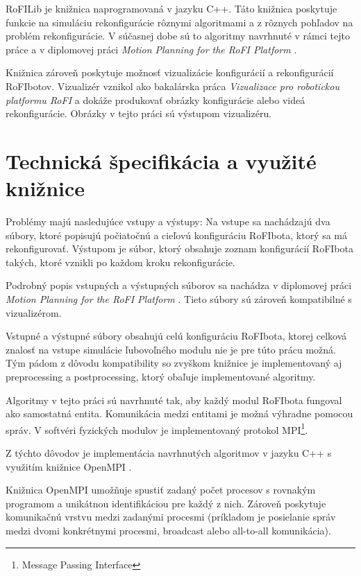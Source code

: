 \documentclass[
  digital, %
  oneside, %
  table,   %
  lof,     %
  nolot,     %
]{fithesis3}
\begin{document}
RoFILib je knižnica naprogramovaná v jazyku C++. Táto knižnica poskytuje funkcie na simuláciu rekonfigurácie rôznymi algoritmami a z rôznych pohľadov na problém rekonfigurácie. V súčasnej dobe sú to algoritmy navrhnuté v rámci tejto práce a v diplomovej práci \textit{Motion Planning for the RoFI Platform} \cite{vozarovaMasterThesis}.

Knižnica zároveň poskytuje možnosť vizualizácie konfigurácií a rekonfigurácií RoFIbotov. Vizualizér vznikol ako bakalárska práca \textit{Vizualizace pro robotickou platformu RoFI} \cite{nausovaBachelorThesis} a dokáže produkovať obrázky konfigurácie alebo videá rekonfigurácie. Obrázky v tejto práci sú výstupom vizualizéru. 

\section{Technická špecifikácia a využité knižnice}
\label{sec:libraries}
Problémy majú nasledujúce vstupy a výstupy: Na vstupe sa nachádzajú dva súbory, ktoré popisujú počiatočnú a cieľovú konfiguráciu RoFIbota, ktorý sa má rekonfigurovať. Výstupom je súbor, ktorý obsahuje zoznam konfigurácií RoFIbota takých, ktoré vznikli po každom kroku rekonfigurácie. 

Podrobný popis vstupných a výstupných súborov sa nachádza v diplomovej práci \textit{Motion Planning for the RoFI Platform} \cite{vozarovaMasterThesis}. Tieto súbory sú zároveň kompatibilné s vizualizérom. 

Vstupné a výstupné súbory obsahujú celú konfiguráciu RoFIbota, ktorej celková znalosť na vstupe simulácie ľubovoľného modulu nie je pre túto prácu možná. Tým pádom z dôvodu kompatibility so zvyškom knižnice je implementovaný aj preprocessing a postprocessing, ktorý obaľuje implementované algoritmy. 

Algoritmy v tejto práci sú navrhnuté tak, aby každý modul RoFIbota fungoval ako samostatná entita. Komunikácia medzi entitami je možná výhradne pomocou správ. V softvéri fyzických modulov je implementovaný protokol MPI\footnote{Message Passing Interface}. 

Z týchto dôvodov je implementácia navrhnutých algoritmov v jazyku C++ s využitím knižnice OpenMPI \cite{openMPILibrary}. 

Knižnica OpenMPI umožňuje spustiť zadaný počet procesov s rovnakým programom a unikátnou identifikáciou pre každý z nich. Zároveň poskytuje komunikačnú vrstvu medzi zadanými procesmi (príkladom je posielanie správ medzi dvomi konkrétnymi procesmi, broadcast alebo all-to-all komunikácia). 
\end{document}

